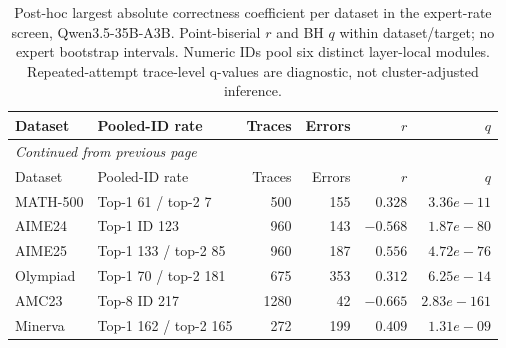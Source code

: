 \begingroup\scriptsize\setlength{\tabcolsep}{4pt}
\begin{longtable}{@{}llrrrr@{}}
\caption{Post-hoc largest absolute correctness coefficient per dataset in the expert-rate screen, Qwen3.5-35B-A3B. Point-biserial $r$ and BH $q$ within dataset/target; no expert bootstrap intervals. Numeric IDs pool six distinct layer-local modules. Repeated-attempt trace-level q-values are diagnostic, not cluster-adjusted inference.}\label{tab:qwen-corr-experts}\\
\toprule
Dataset & Pooled-ID rate & Traces & Errors & $r$ & $q$ \\
\midrule\endfirsthead
\multicolumn{6}{l}{\textit{Continued from previous page}}\\
\toprule
Dataset & Pooled-ID rate & Traces & Errors & $r$ & $q$ \\
\midrule\endhead
\bottomrule\endfoot
MATH-500 & Top-1 61 / top-2 7 & 500 & 155 & $0.328$ & $3.36e-11$ \\
AIME24 & Top-1 ID 123 & 960 & 143 & $-0.568$ & $1.87e-80$ \\
AIME25 & Top-1 133 / top-2 85 & 960 & 187 & $0.556$ & $4.72e-76$ \\
Olympiad & Top-1 70 / top-2 181 & 675 & 353 & $0.312$ & $6.25e-14$ \\
AMC23 & Top-8 ID 217 & 1280 & 42 & $-0.665$ & $2.83e-161$ \\
Minerva & Top-1 162 / top-2 165 & 272 & 199 & $0.409$ & $1.31e-09$ \\
\end{longtable}\endgroup
